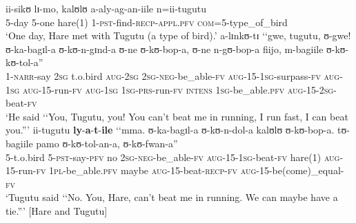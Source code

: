 \begin{exe}
\ex\label{exOpeningHareTugutu}
\begin{xlist}
\ex \label{exOpeningHareTugutuSentence1}\gll ii-sikʊ lɪ-mo, kalʊlʊ a-aly-ag-an-iile n=ii-tugutu\\
5-day 5-one hare(1) 1-\textsc{pst}-find-\textsc{recp}-\textsc{appl.}\textsc{pfv} \textsc{com}=5-type\_of\_bird\\
\glt \lq One day, Hare met with Tugutu (a type of bird).'
\ex \label{exOpeningHareTugutuSentence2}
\gll a-lɪnkʊ-tɪ \textup{\lq\lq}gwe, tugutu, ʊ-gwe! ʊ-ka-bagɪl-a ʊ-kʊ-n-gɪnd-a ʊ-ne ʊ-kʊ-bop-a, ʊ-ne n-gʊ-bop-a fiijo, m-bagiile ʊ-kʊ-kʊ-tol-a\textup{''}\\
1-\textsc{narr}-say \phantom{\lq\lq}\textsc{2sg} t.o.bird \textsc{aug}-\textsc{2sg} \textsc{2sg}-\textsc{neg}-be\_able-\textsc{fv} \textsc{aug}-15-\textsc{1sg}-surpass-\textsc{fv} \textsc{aug}-\textsc{1sg} \textsc{aug}-15-run-\textsc{fv} \textsc{aug}-\textsc{1sg} \textsc{1sg}-\textsc{prs}-run-\textsc{fv} \textsc{intens} \textsc{1sg}-be\_able.\textsc{pfv} \textsc{aug}-15-\textsc{2sg}-beat-\textsc{fv}\\
\glt \lq He said \lq\lq You, Tugutu, you! You can't beat me in running, I run fast, I can beat you.'''
\ex \label{exOpeningHareTugutuSentence3}\gll ii-tugutu \textbf{ly}-\textbf{a}-\textbf{t}-\textbf{ile} \textup{\lq\lq}mma. ʊ-ka-bagɪl-a ʊ-kʊ-n-dol-a kalʊlʊ ʊ-kʊ-bop-a. tʊ-bagiile pamo ʊ-kʊ-tol-an-a, ʊ-kʊ-fwan-a\textup{''}\\
5-t.o.bird 5-\textsc{pst}-say-\textsc{pfv} \phantom{\lq\lq}no \textsc{2sg}-\textsc{neg}-be\_able-\textsc{fv} \textsc{aug}-15-\textsc{1sg}-beat-\textsc{fv} hare(1) \textsc{aug}-15-run-\textsc{fv} \textsc{1pl}-be\_able.\textsc{pfv} maybe \textsc{aug}-15-beat-\textsc{recp}-\textsc{fv} \textsc{aug}-15-be(come)\_equal-\textsc{fv}\\
\glt \lq Tugutu said \lq\lq No. You, Hare, can't beat me in running. We can maybe have a tie.''{}' [Hare and Tugutu]
\end{xlist}
\end{exe}

